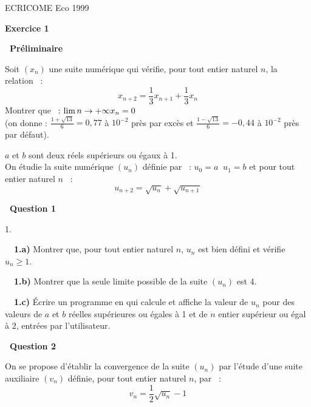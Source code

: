 \documentclass[11pt]{article}%
\begin{document}
\begin{center}
{\Huge ECRICOME Eco 1999}
\end{center}

\begin{center}
\textbf{\large Exercice 1 }
\end{center}



\noindent\textbf{\ Préliminaire}

Soit $(x_{n})$ une suite numérique qui vérifie, pour tout entier
naturel $n
$, la relation~ : 
\[
x_{n + 2} = \frac{1}{3} x_{n + 1} + \frac{1}{3} x_{n}
\]
Montrer que~ : $ \lim{n \rightarrow + \infty} x_{n} = 0$\\
(on donne : $\frac{1 + \sqrt{13}}{6} = 0,77$ à $10^{-2}$ près par excès
et $\frac{1-\sqrt{13}}{ 6} = -0,44$ à $10^{-2}$ près par défaut).

$a$ et $b$ sont deux réels supérieurs ou égaux à 1.\\
On étudie la suite numérique $(u_{n})$ définie par~ : $u_{0} = a
\;\;u_{1} = b$
et pour tout entier naturel $n$~ : 
\[
u_{n + 2} = \sqrt{u_{n}} + \sqrt{u_{n + 1}}
\]

\textbf{\ Question 1}

\begin{noliste}{1.}
 \setlength{\itemsep}{4mm}
\item[ \ \textbf{\ 1.a)}] Montrer que, pour tout entier naturel $n$,
$u_{n}$ est
bien défini et vérifie $u_{n} \geq 1$.

\item[ \ \textbf{\ 1.b)}] Montrer que la seule limite possible de la
suite $(u_{n})$ est 4.

\item[ \ \textbf{\ 1.c)}] Écrire un programme en \Scilab{} qui calcule
et
affiche la valeur de $u_{n}$ pour des valeurs de $a$ et $b$ réelles
supérieures ou égales à 1 et de $n$ entier supérieur ou égal à
2, entrées par l'utilisateur.
\end{noliste}

\textbf{\ Question 2}

On se propose d'établir la convergence de la suite $(u_{n})$ par
l'étude
d'une suite auxiliaire $(v_{n})$ définie, pour tout entier naturel $n$,
par~ : 
\[
v_{n} = \frac{1}{2} \sqrt{u_{n}} -1
\]
\end{document}
